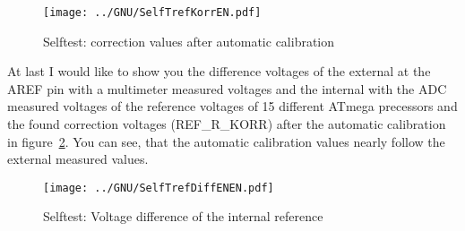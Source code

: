 \begin{figure}[H]
  \centering
  \texttt{[image: ../GNU/SelfTrefKorrEN.pdf]}
  \caption{Selftest: correction values after automatic calibration}
  \label{fig:SelfTrefKorr}
\end{figure}

At last I would like to show you the difference voltages of the external at the
AREF pin with a multimeter measured voltages and the internal with the ADC
measured voltages of the reference voltages of 15 different ATmega precessors
and the found correction voltages (REF\_R\_KORR) after the automatic calibration in
figure~\ref{fig:SelfTrefDiff}.
You can see, that the automatic calibration values nearly follow the external measured values.

\begin{figure}[H]
  \centering
  \texttt{[image: ../GNU/SelfTrefDiffENEN.pdf]}
  \caption{Selftest: Voltage difference of the internal reference}
  \label{fig:SelfTrefDiff}
\end{figure}

